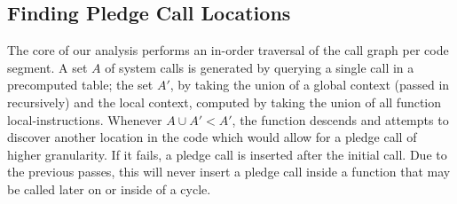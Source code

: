 \subsection{Finding Pledge Call Locations }

The core of our analysis performs an in-order traversal of the call graph per code segment. A set \(A\) of system calls is generated by querying a single call in a precomputed table; the set \(A'\), by taking the union of a global context (passed in recursively) and the local context, computed by taking the union of all function local-instructions. Whenever \(A \cup A' < A'\), the function descends and attempts to discover another location in the code which would allow for a pledge call of higher granularity. If it fails, a pledge call is inserted after the initial call. Due to the previous passes, this will never insert a pledge call inside a function that may be called later on or inside of a cycle.